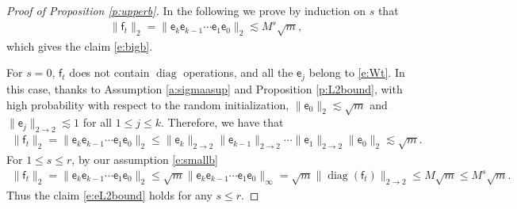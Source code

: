 \documentclass{article}
\numberwithin{equation}{section}
\newcommand{\sfe}{{\mathsf e}}
\newcommand{\sff}{{\mathsf f}}
\DeclareMathOperator{\diag}{diag}
\renewcommand{\leq}{\leqslant}
\newcommand{\1}{\mathds{1}}
\theoremstyle{plain} %
\begin{document}
\begin{proof}[Proof of Proposition \ref{p:upperb}]
In the following we prove by induction on $s$ that 
\begin{align}\label{e:eL2bound}
\|\sff_t\|_{2}=\|\sfe_k\sfe_{k-1}\cdots\sfe_1\sfe_0\|_2\lesssim M^{s} \sqrt m,
\end{align}
which gives the claim \eqref{e:bigb}.

For $s=0$, $\sff_t$ does not contain $\diag$ operations, and all the $\sfe_j$ belong to \eqref{e:Wt}. In this case, thanks to Assumption \ref{a:sigmaasup} and Proposition \ref{p:L2bound}, with high probability with respect to the random 
initialization,  $\|\sfe_0\|_2\lesssim \sqrt m$ and $\|\sfe_{j}\|_{2\rightarrow 2}\lesssim 1$ for all $1\leq j\leq k$. Therefore, we have that 
\begin{align*}
\|\sff_t\|_{2} =\|\sfe_k\sfe_{k-1}\cdots\sfe_1\sfe_0\|_2
\leq \|\sfe_k\|_{2\rightarrow 2}\|\sfe_{k-1}\|_{2\rightarrow 2}\cdots\|\sfe_1\|_{2\rightarrow 2}\|\sfe_0\|_2
\lesssim \sqrt m.
\end{align*}
For $1\leq s\leq r$, by our assumption \eqref{e:smallb}
\begin{align*}
 \|\sff_t\|_2=\|\sfe_k\sfe_{k-1}\cdots\sfe_1\sfe_0\|_2\leq \sqrt m\|\sfe_k\sfe_{k-1}\cdots\sfe_1\sfe_0\|_\infty=\sqrt m \|\diag(\sff_t)\|_{2\rightarrow 2}\leq M\sqrt m\leq M^s \sqrt m.
\end{align*}
Thus the claim \eqref{e:eL2bound} holds for any $s\leq r$. 



\end{proof}
\end{document}
